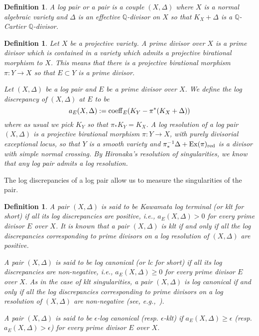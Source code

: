 \documentclass{amsart}
\renewcommand{\qq}{\mathbb{Q}}
\newtheorem{definition}[theorem]{Definition}
\theoremstyle{remark}
\numberwithin{equation}{section}
\begin{document}
\begin{definition}
{\em A {\em log pair} or a {\em pair} is a couple
$(X,\Delta)$ where $X$ is a normal algebraic variety and $\Delta$ is an effective $\qq$-divisor on $X$ so that $K_X+\Delta$ is a $\qq$-Cartier $\qq$-divisor.
}
\end{definition} 

\begin{definition}{\em 
Let $X$ be a projective variety.
A {\em prime divisor over $X$} is a prime divisor which is contained in a variety which admits a projective birational morphism to $X$.
This means that there is a projective birational morphism
$\pi\colon Y\rightarrow X$ so that $E\subset Y$
is a prime divisor.

Let $(X,\Delta)$ be a log pair and $E$ be a prime divisor over $X$.
We define the {\em log discrepancy}
of $(X,\Delta)$ at $E$ to be
\[
a_E(X,\Delta):=
{\rm coeff}_E(K_Y-\pi^*(K_X+\Delta))
\]
where as usual we pick $K_Y$ so that $\pi_*K_Y=K_X$.
A {\em log resolution} of a log pair $(X,\Delta)$ is a projective birational morphism $\pi\colon Y\rightarrow X$,
with purely divisorial exceptional locus,
so that
$Y$ is a smooth variety and $\pi^{-1}_*\Delta+{\rm Ex}(\pi)_{\rm red}$ is a divisor with simple normal crossing.
By Hironaka's resolution of singularities, we know that any
log pair admits a log resolution.
}
\end{definition}

The log discrepancies of a log pair allow us to measure the singularities of the pair.

\begin{definition}{\em 
A pair $(X,\Delta)$ is said to be {\em Kawamata log terminal} (or {\em klt} for short) if all its log discrepancies are positive, 
i.e., $a_E(X,\Delta)>0$ for every prime divisor $E$ over $X$. It is known that a pair $(X,\Delta)$ is klt if and only if all the log discrepancies corresponding to prime divisors on a log resolution of $(X,\Delta)$ are positive.

A pair $(X,\Delta)$ is said to be {\em log canonical} (or {\em lc} for short) if all its log discrepancies are non-negative, 
i.e., $a_E(X,\Delta)\geq 0$ for every prime divisor $E$ over $X$.
As in the case of klt singularities, a pair $(X,\Delta)$ is log canonical if and only if all the log discrepancies corresponding to prime divisors on a log resolution of $(X,\Delta)$ are non-negative (see, e.g.,~\cite{KM98}).

A pair $(X,\Delta)$ is said to be {\em $\epsilon$-log canonical}
(resp. {\em $\epsilon$-klt}) if $a_E(X,\Delta)\geq \epsilon$
(resp. $a_E(X,\Delta)>\epsilon$) for every prime divisor $E$ over $X$.
}
\end{definition}
\end{document}
